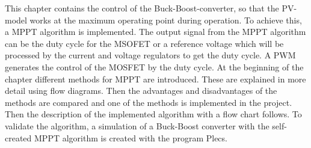 This chapter contains the control of the Buck-Boost-converter, so that the PV-model works at the maximum operating point during operation. To achieve this, a MPPT algorithm is implemented. The output signal from the MPPT algorithm can be the duty cycle for the MSOFET or a reference voltage which will be processed by the current and voltage regulators to get the duty cycle. A PWM generates the control of the MOSFET by the duty cycle. At the beginning of the chapter different methods for MPPT are introduced. These are explained in more detail using flow diagrams. Then the advantages and disadvantages of the methods are compared and one of the methods is implemented in the project. Then the description of the implemented algorithm with a flow chart follows. To validate the algorithm, a simulation of a Buck-Boost converter with the self-created MPPT algorithm is created with the program Plecs.